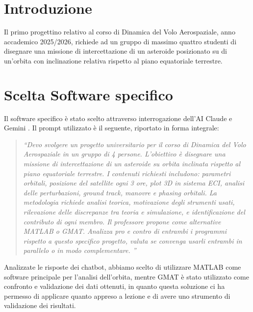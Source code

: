 \documentclass[12pt, a4paper]{article}
\begin{document}
\newpage
\tableofcontents 
\newpage


\section{Introduzione}
Il primo progettino relativo al corso di Dinamica del Volo Aerospaziale, anno accademico 2025/2026, richiede ad un gruppo di massimo quattro studenti di disegnare una missione di intercettazione di un asteroide posizionato su di un'orbita con inclinazione relativa rispetto al piano equatoriale terrestre.
\section{Scelta Software specifico}
Il software specifico è stato scelto attraverso interrogazione dell'AI Claude \parencite{Claude} e Gemini \parencite{Gemini}. Il prompt utilizzato è il seguente, riportato in forma integrale:  

\begin{quote}
    \itshape 
    \textsf{ 
        ``Devo svolgere un progetto universitario per il corso di Dinamica del Volo Aerospaziale in un gruppo di 4 persone. L'obiettivo è disegnare una missione di intercettazione di un asteroide su orbita inclinata rispetto al piano equatoriale terrestre. I contenuti richiesti includono: parametri orbitali, posizione del satellite ogni 3 ore, plot 3D in sistema ECI, analisi delle perturbazioni, ground track, manovre e phasing orbitali. La metodologia richiede analisi teorica, motivazione degli strumenti usati, rilevazione delle discrepanze tra teoria e simulazione, e identificazione del contributo di ogni membro. Il professore propone come alternative MATLAB o GMAT. Analizza pro e contro di entrambi i programmi rispetto a questo specifico progetto, valuta se convenga usarli entrambi in parallelo o in modo complementare. ''
    }
\end{quote}

Analizzate le risposte dei chatbot, abbiamo scelto di utilizzare MATLAB come software principale per l'analisi dell'orbita, mentre GMAT è stato utilizzato come confronto e validazione dei dati ottenuti, in quanto questa soluzione ci ha permesso di applicare quanto appreso a lezione e di avere uno strumento di validazione dei risultati.  
\end{document}

